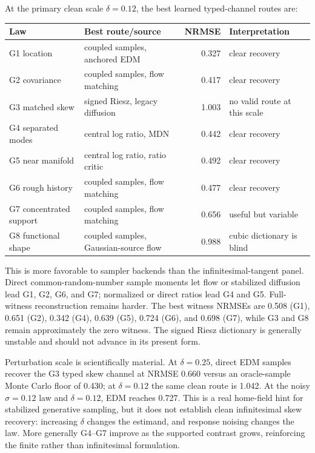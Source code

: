 At the primary clean scale $\delta=0.12$, the best learned typed-channel routes
are:

\begin{center}
\begin{tabularx}{\linewidth}{@{}l X r X@{}}
\toprule
Law & Best route/source & NRMSE & Interpretation \\
\midrule
G1 location & coupled samples, anchored EDM & 0.327 & clear recovery \\
G2 covariance & coupled samples, flow matching & 0.417 & clear recovery \\
G3 matched skew & signed Riesz, legacy diffusion & 1.003 & no valid route at this scale \\
G4 separated modes & central log ratio, MDN & 0.442 & clear recovery \\
G5 near manifold & central log ratio, ratio critic & 0.492 & clear recovery \\
G6 rough history & coupled samples, flow matching & 0.477 & clear recovery \\
G7 concentrated support & coupled samples, flow matching & 0.656 & useful but variable \\
G8 functional shape & coupled samples, Gaussian-source flow & 0.988 & cubic dictionary is blind \\
\bottomrule
\end{tabularx}
\end{center}

This is more favorable to sampler backends than the infinitesimal-tangent panel.
Direct common-random-number sample moments let flow or stabilized diffusion lead
G1, G2, G6, and G7; normalized or direct ratios lead G4 and G5.  Full-witness
reconstruction remains harder.  The best witness NRMSEs are 0.508 (G1), 0.651
(G2), 0.342 (G4), 0.639 (G5), 0.724 (G6), and 0.698 (G7), while G3 and G8 remain
approximately the zero witness.  The signed Riesz dictionary is generally
unstable and should not advance in its present form.

Perturbation scale is scientifically material.  At $\delta=0.25$, direct EDM
samples recover the G3 typed skew channel at NRMSE 0.660 versus an oracle-sample
Monte Carlo floor of 0.430; at $\delta=0.12$ the same clean route is 1.042.  At
the noisy $\sigma=0.12$ law and $\delta=0.12$, EDM reaches 0.727.  This is a real
home-field hint for stabilized generative sampling, but it does not establish
clean infinitesimal skew recovery: increasing $\delta$ changes the estimand, and
response noising changes the law.  More generally G4--G7 improve as the supported
contrast grows, reinforcing the finite rather than infinitesimal formulation.

